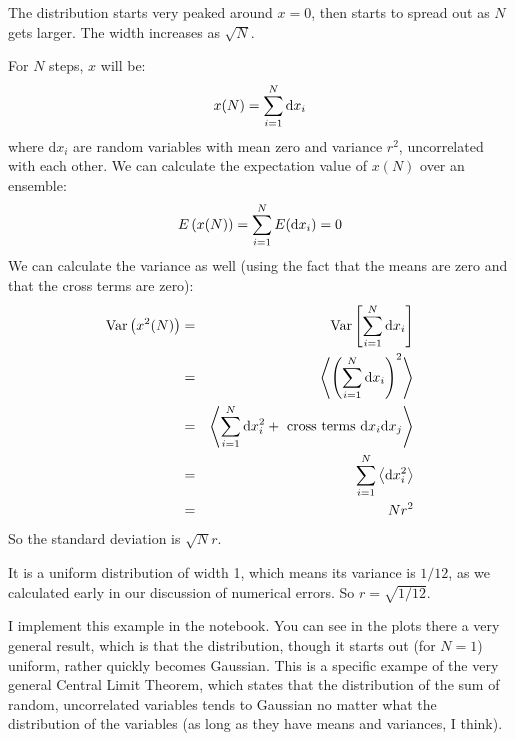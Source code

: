 
\begin{answer}
The distribution starts very peaked around $x=0$, then starts to
spread out as $N$ gets larger. The width increases as $\sqrt{N}$.
\end{answer}


\begin{answer}
  For $N$ steps, $x$ will be:
  \begin{equation}
    x(N) = \sum_{i=1}^{N} {\rm d}x_i
  \end{equation}
  where d$x_i$ are random variables with mean zero and variance $r^2$,
  uncorrelated with each other. We can calculate the expectation value
  of $x(N)$ over an ensemble:
  \begin{equation}
    E\left(x(N)\right) = \sum_{i=1}^{N} E({\rm d}x_i) = 0
  \end{equation}
  We can calculate the variance as well (using the fact that the means
  are zero and that the cross terms are zero):
  \begin{eqnarray}
    {\rm Var}\left(x^2(N)\right)
    &=& {\rm Var}\left[\sum_{i=1}^{N} {\rm d}x_i\right] \cr
    &=& \left\langle\left(\sum_{i=1}^{N} {\rm
      d}x_i\right)^2\right\rangle \cr
    &=& \left\langle\sum_{i=1}^{N} {\rm d}x_i^2 + {\rm
        ~cross~terms~d}x_i{\rm d}x_j \right\rangle \cr
    &=& \sum_{i=1}^{N} \left\langle {\rm d}x_i^2 \right\rangle \cr
    &=& N r^2
  \end{eqnarray}
  So the standard deviation is $\sqrt{N} r$.
\end{answer}


\begin{answer}
It is a uniform distribution of width 1, which means its variance is
$1/12$, as we calculated early in our discussion of numerical
errors. So $r= \sqrt{1/12}$.
\end{answer}

I implement this example in the notebook. You can see in the plots
there a very general result, which is that the distribution, though it
starts out (for $N=1$) uniform, rather quickly becomes Gaussian. This
is a specific exampe of the very general Central Limit Theorem, which
states that the distribution of the sum of random, uncorrelated
variables tends to Gaussian no matter what the distribution of the
variables (as long as they have means and variances, I think).

